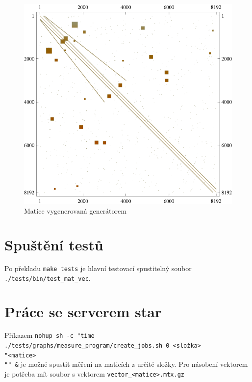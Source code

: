 \documentclass[thesis=B,czech]{FITthesis}[2012/06/26]
\begin{document}
\begin{figure}[htb]
	\includegraphics[width=1.0\textwidth]{./images/generated_matrix}
	\caption{Matice vygenerovaná generátorem}
	\label{fig:generatedMtx}
\end{figure}

\section{Spuštění testů}

Po překladu \texttt{make tests} je hlavní testovací spustitelný soubor \texttt{./tests/bin/test\_mat\_vec}.

\section{Práce se serverem star}

Příkazem \texttt{nohup sh -c "time ./tests/graphs/measure_program/create_jobs.sh 0 <složka> \\"<matice>\\"" &} je možné spustit měření na maticích z určité složky. Pro násobení vektorem je potřeba mít soubor s vektorem \texttt{vector_<matice>.mtx.gz}
\end{document}
